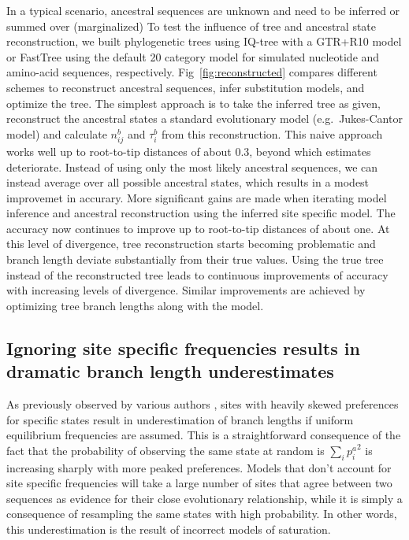 \documentclass[aps,rmp,twocolumn]{revtex4}
\newcommand{\eqp}{p}
\begin{document}
In a typical scenario, ancestral sequences are unknown and need to be inferred or summed over (marginalized)
To test the influence of tree and ancestral state reconstruction, we built phylogenetic trees using IQ-tree \citep{nguyen_iq-tree:_2015} with a GTR+R10 model or FastTree \citep{Price} using the default 20 category model for simulated nucleotide and amino-acid sequences, respectively.
Fig~\ref{fig:reconstructed} compares different schemes to reconstruct ancestral sequences, infer substitution models, and optimize the tree.
The simplest approach is to take the inferred tree as given, reconstruct the ancestral states a standard evolutionary model (e.g.~Jukes-Cantor model) and calculate $n^b_{ij}$ and $\tau_i^b$ from this reconstruction.
This naive approach works well up to root-to-tip distances of about 0.3, beyond which estimates deteriorate.
Instead of using only the most likely ancestral sequences, we can instead average over all possible ancestral states, which results in a modest improvemet in accurary.
More significant gains are made when iterating model inference and ancestral reconstruction using the inferred site specific model.
The accuracy now continues to improve up to root-to-tip distances of about one.
At this level of divergence, tree reconstruction starts becoming problematic and branch length deviate substantially from their true values.
Using the true tree instead of the reconstructed tree leads to continuous improvements of accuracy with increasing levels of divergence.
Similar improvements are achieved by optimizing tree branch lengths along with the model.


\subsection*{Ignoring site specific frequencies results in dramatic branch length underestimates}
As previously observed by various authors \citep{halpern_evolutionary_1998,hilton_modeling_2018}, sites with heavily skewed preferences for specific states result in underestimation of branch lengths if uniform equilibrium frequencies are assumed.
This is a straightforward consequence of the fact that the probability of observing the same state at random is $\sum_i{\eqp_i^a}^2$ is increasing sharply with more peaked preferences.
Models that don't account for site specific frequencies will take a large number of sites that agree between two sequences as evidence for their close evolutionary relationship, while it is simply a consequence of resampling the same states with high probability.
In other words, this underestimation is the result of incorrect models of saturation.
\end{document}
